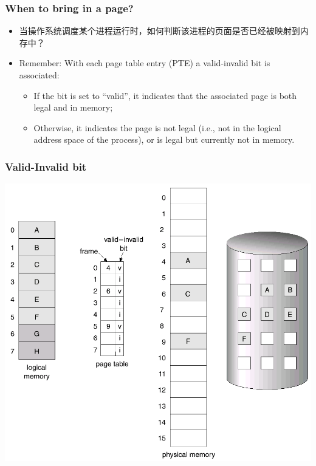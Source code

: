 \documentclass[CJKutf8,xcolor=pdftex,dvipsnames,table]{beamer}
\begin{document}
\begin{CJK*}{UTF8}{song}
  \begin{frame}
    \frametitle{When to bring in a page?} \pause
    \begin{itemize}
    \item{当操作系统调度某个进程运行时，如何判断该进程的页面是否已经被映射到内存中？} \pause
    \item{Remember: With each page table entry (PTE) a valid-invalid bit is associated: } \pause
      \begin{itemize}
      \item{If the bit is set to ``valid'', it indicates that the associated page is both legal and in memory;} \pause
      \item{Otherwise, it indicates the page is not legal (i.e., not in the
          logical address space of the process), or is legal but currently
          not in memory.}
      \end{itemize}
    \end{itemize}
  \end{frame}
  
  \begin{frame}
    \frametitle{Valid-Invalid bit} \pause
    \begin{center}
      \includegraphics[scale=.3]{v6f10-3}
    \end{center}
  \end{frame}
  

\end{CJK*}
\end{document}
